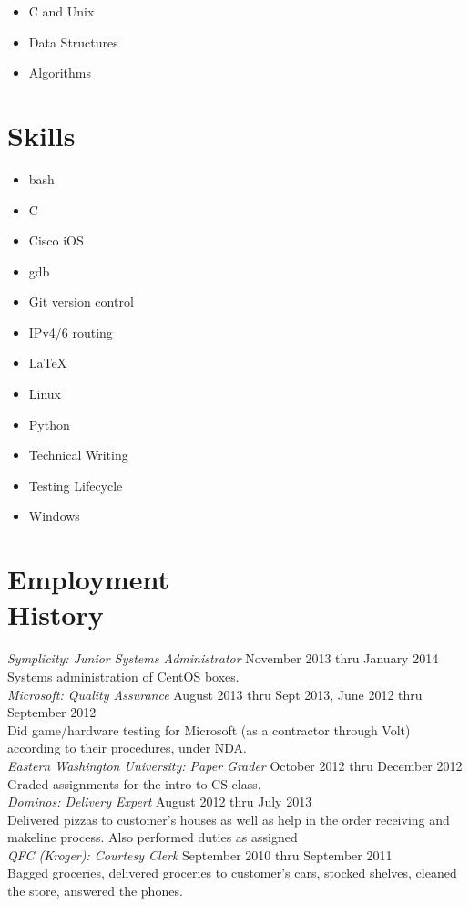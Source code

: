 \documentclass[line, margin]{res}
\begin{document}
\begin{resume}
	\begin{multicols}{3}
		\begin{itemize}
			\item C and Unix
			\item Data Structures
			\item Algorithms
		\end{itemize}
	\end{multicols}

	\section{Skills}
	\begin{multicols}{3}
		\begin{itemize}
			\item bash
			\item C
			\item Cisco iOS
			\item gdb
			\item Git version control
			\item IPv4/6 routing
			\item \LaTeX
			\item Linux
			\item Python
			\item Technical Writing
			\item Testing Lifecycle
			\item Windows
		\end{itemize}
	\end{multicols}

	\section{Employment\\History}
	\textit{Symplicity: Junior Systems Administrator} \hfill November 2013 thru January 2014 \\
	Systems administration of CentOS boxes. \\ [6pt]
	\textit{Microsoft: Quality Assurance} \hfill August 2013 thru Sept 2013, June 2012 thru September 2012 \\
	Did game/hardware testing for Microsoft (as a contractor through Volt) according to their procedures, under NDA. \\ [6pt]
	\textit{Eastern Washington University: Paper Grader} \hfill October 2012 thru December 2012 \\
	Graded assignments for the intro to CS class. \\ [12pt]
	\textit{Dominos: Delivery Expert} \hfill August 2012 thru July 2013 \\
	Delivered pizzas to customer's houses as well as help in the order
	receiving and makeline process. Also performed duties as assigned \\ [6pt]
	\textit{QFC (Kroger): Courtesy Clerk} \hfill September 2010 thru September 2011 \\
	Bagged groceries, delivered groceries to customer's cars, stocked
	shelves, cleaned the store, answered the phones. \\ 

\end{resume}
\end{document}
